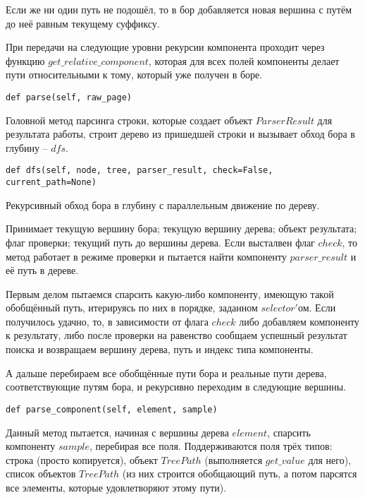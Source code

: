 Если же ни один путь не подошёл, то в бор добавляется новая вершина с путём до неё равным текущему суффиксу.

При передачи на следующие уровни рекурсии компонента проходит через функцию $get\_relative\_component$, которая для всех полей компоненты делает пути относительными к тому, который уже получен в боре.
\\

\begin{lstlisting}
def parse(self, raw_page)
\end{lstlisting}
Головной метод парсинга строки, которые создает объект $ParserResult$ для результата работы, строит дерево из пришедшей строки и вызывает обход бора в глубину -- $dfs$.
\\

\begin{lstlisting}
def dfs(self, node, tree, parser_result, check=False, current_path=None)
\end{lstlisting}
Рекурсивный обход бора в глубину с параллельным движение по дереву.

Принимает текущую вершину бора; текущую вершину дерева; объект результата; флаг проверки; текущий путь до вершины дерева. Если высталвен флаг $check$, то метод работает в режиме проверки и пытается найти компоненту $parser\_result$ и её путь в дереве.

Первым делом пытаемся спарсить какую-либо компоненту, имеющую такой обобщённый путь, итерируясь по них в порядке, заданном $selector'$ом. Если получилось удачно, то, в зависимости от флага $check$ либо добавляем компоненту к результату, либо после проверки на равенство сообщаем успешный результат поиска и возвращаем вершину дерева, путь и индекс типа компоненты.

А дальше перебираем все обобщённые пути бора и реальные пути дерева, соответствующие путям бора, и рекурсивно переходим в следующие вершины.
\\

\begin{lstlisting}
def parse_component(self, element, sample)
\end{lstlisting}
Данный метод пытается, начиная с вершины дерева $element$, спарсить компоненту $sample$, перебирая все поля. Поддерживаются поля трёх типов: строка (просто копируется), объект $TreePath$ (выполняется $get\_value$ для него), список объектов $TreePath$ (из них строится обобщающий путь, а потом парсятся все элементы, которые удовлетворяют этому пути).
\\

